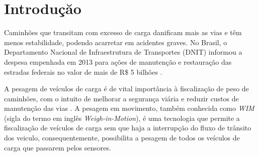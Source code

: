 \documentclass{ufscThesis}
\begin{document}
\capa  
\folhaderosto[comficha] %

\newpage
%
\newpage

\folhaaprovacao
\paginadedicatoria
\paginaagradecimento
\paginaepigrafe
\paginaresumo
\paginaabstract
\listadefiguras
\listadetabelas 
\listadeabreviaturas
\listadesimbolos
\sumario



\chapter{Introduçăo}\label{introducao}
Caminhões que transitam com excesso de carga danificam mais as vias e têm menos estabilidade, podendo acarretar em acidentes graves. No Brasil, o Departamento Nacional de Infraestrutura de Transportes (DNIT) informou a despesa empenhada em 2013 para ações de manutenção e restauração das estradas federais no valor de mais de R\$ 5 bilhões \cite{tech:relatorio-de-gestao-do-exercicio-de-2013}.

A pesagem de veículos de carga é de vital importância à fiscalização de peso de caminhões, com o intuito de melhorar a segurança viária e reduzir custos de manutenção das vias \cite{techreport:jacob2002wave}. A pesagem em movimento, também conhecida como \textit{WIM} (sigla do termo em inglês \textit{Weigh-in-Motion}), é uma tecnologia que permite a fiscalização de veículos de carga sem que haja a interrupção do fluxo de trânsito dos veiculo, consequentemente, possibilita a pesagem de todos os veículos de carga que passarem pelos sensores.
\end{document}
